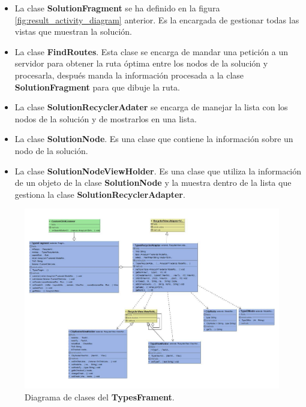 \begin{itemize}
	\item La clase \textbf{SolutionFragment} se ha definido en la figura \ref{fig:result_activity_diagram} anterior. Es la encargada de gestionar todas las vistas que muestran la solución.
	\item La clase \textbf{FindRoutes}. Esta clase se encarga de mandar una petición a un servidor para obtener la ruta óptima entre los nodos de la solución y procesarla, después manda la información procesada a la clase \textbf{SolutionFragment} para que dibuje la ruta.
	\item La clase \textbf{SolutionRecyclerAdater} se encarga de manejar la lista con los nodos de la solución y de mostrarlos en una lista.
	\item La clase \textbf{SolutionNode}. Es una clase que contiene la información sobre un nodo de la solución.
	\item La clase \textbf{SolutionNodeViewHolder}. Es una clase que utiliza la información de un objeto de la clase \textbf{SolutionNode}  y la muestra dentro de la lista que gestiona la clase \textbf{SolutionRecyclerAdapter}.
\end{itemize}
\newpage
\begin{figure}[H]
	\centering
	\includegraphics[scale=.8,angle=90]{imagenes/fragment_class_diagram.pdf}
	\caption{Diagrama de clases del \textbf{TypesFrament}.}
	\label{fig:fragment_diagram}
\end{figure}
